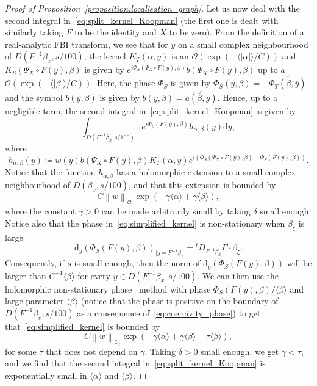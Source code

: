 \documentclass[10pt]{amsart}
\theoremstyle{definition}\newtheorem{defi}[theo]{Definition}\newtheorem{rema}[theo]{Remark}\newtheorem{exam}[theo]{Example}\newtheorem{exem}[theo]{Example}\newtheorem{nota}[theo]{Notation}
\newcommand{\p}[1]{\left(#1\right)}
\newcommand{\n}[1]{\left\|#1\right\|}
\newcommand{\va}[1]{\left|#1\right|}
\newcommand{\brac}[1]{\langle #1 \rangle}
\newcommand{\clO}{\mathcal{O}}
\newcommand{\rmd}{\mathrm{d}}
\begin{document}
\begin{proof}[Proof of Proposition~\ref{proposition:localisation_graph}]
Let us now deal with the second integral in~\eqref{eq:split_kernel_Koopman} (the first one is dealt with similarly taking $F$ to be the identity and $X$ to be zero). From the definition of a real-analytic FBI transform, we see that for $y$ on a small complex neighbourhood of $D(F^{-1} \beta_x,s/100)$, the kernel $K_T(\alpha,y)$ is an $\clO\p{\exp\p{- \brac{\va{\alpha}}/C}}$ and $K_S(\Psi_X \circ F(y),\beta)$ is given by $e^{i \Phi_S(\Psi_X \circ F(y),\beta)} b(\Psi_X \circ F(y),\beta)$ up to a $\clO\p{\exp\p{- \brac{\va{\beta}}/C}}$. Here, the phase $\Phi_S$ is given by $\Phi_S(y,\beta) = - \overline{\Phi_T(\bar{\beta},\bar{y})}$ and the symbol $b(y,\beta)$ is given by $b(y,\beta) = \overline{a(\bar{\beta},\bar{y})}$. Hence, up to a negligible term, the second integral in~\eqref{eq:split_kernel_Koopman} is given by
\begin{equation}\label{eq:simplified_kernel}
\int_{D\left(F^{-1} \beta_x,s/100\right)} e^{i \Phi_S(F (y),\beta)} h_{\alpha,\beta}(y) \rmd y,
\end{equation}
where
\begin{equation*}
h_{\alpha,\beta}(y) \coloneqq w(y) b(\Psi_X \circ F(y),\beta) K_T(\alpha,y) e^{i \left(\Phi_S(\Psi_X \circ F (y),\beta) - \Phi_S(F(y),\beta)\right)}.
\end{equation*}
Notice that the function $h_{\alpha,\beta}$ has a holomorphic extension to a small complex neighbourhood of $D(\beta_x,s/100)$, and that this extension is bounded by
\begin{equation*}
C \n{w}_{\clO_\epsilon} \exp\p{ - \gamma \brac{\alpha} + \gamma \brac{\beta} },
\end{equation*}
where the constant $\gamma > 0$ can be made arbitrarily small by taking $\delta$ small enough. Notice also that the phase in~\eqref{eq:simplified_kernel} is non-stationary when $\beta_\xi$ is large:
\begin{equation*}
\rmd _y\p{\Phi_S (F(y),\beta)}_{| y = F^{-1} \beta_x} = {}^t D_{F^{-1} \beta_x} F \cdot \beta_\xi.
\end{equation*}
Consequently, if $s$ is small enough, then the norm of $\rmd _y\p{\Phi_S (F(y),\beta)}$ will be larger than $C^{-1} \brac{\beta}$ for every $y \in D(F^{-1} \beta_x,s/100)$. We can then use the holomorphic non-stationary phase~\cite[Proposition~1.1]{BJ20} method with phase $\Phi_S(F(y),\beta)/ \brac{\beta}$ and large parameter $\brac{\beta}$ (notice that the phase is positive on the boundary of $D(F^{-1} \beta_x,s/100)$ as a consequence of~\eqref{eq:coercivity_phase}) to get that~\eqref{eq:simplified_kernel} is bounded by
\begin{equation*}
C \n{w}_{\clO_\epsilon} \exp\p{ - \gamma \brac{\alpha} + \gamma \brac{\beta} - \tau \brac{\beta}},
\end{equation*}
for some $\tau$ that does not depend on $\gamma$. Taking $\delta > 0$ small enough, we get $\gamma < \tau$, and we find that the second integral in~\eqref{eq:split_kernel_Koopman} is exponentially small in $\brac{\alpha}$ and $\brac{\beta}$.


\end{proof}
\end{document}
